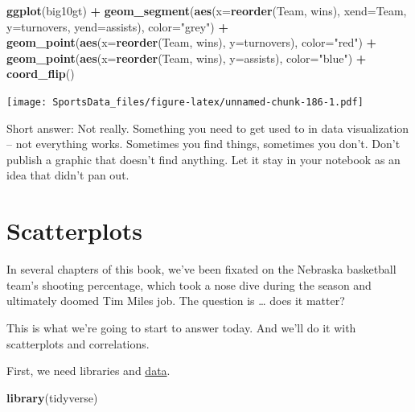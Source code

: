 \documentclass[
]{book}
\newenvironment{Shaded}{\begin{snugshade}}{\end{snugshade}}
\newcommand{\DataTypeTok}[1]{\textcolor[rgb]{0.13,0.29,0.53}{#1}}
\newcommand{\KeywordTok}[1]{\textcolor[rgb]{0.13,0.29,0.53}{\textbf{#1}}}
\newcommand{\NormalTok}[1]{#1}
\newcommand{\OperatorTok}[1]{\textcolor[rgb]{0.81,0.36,0.00}{\textbf{#1}}}
\newcommand{\StringTok}[1]{\textcolor[rgb]{0.31,0.60,0.02}{#1}}
\begin{document}
\begin{Shaded}
\begin{Highlighting}[]
\KeywordTok{ggplot}\NormalTok{(big10gt) }\OperatorTok{+}
\StringTok{  }\KeywordTok{geom_segment}\NormalTok{(}\KeywordTok{aes}\NormalTok{(}\DataTypeTok{x=}\KeywordTok{reorder}\NormalTok{(Team, wins), }\DataTypeTok{xend=}\NormalTok{Team, }\DataTypeTok{y=}\NormalTok{turnovers, }\DataTypeTok{yend=}\NormalTok{assists), }\DataTypeTok{color=}\StringTok{"grey"}\NormalTok{) }\OperatorTok{+}\StringTok{ }
\StringTok{  }\KeywordTok{geom_point}\NormalTok{(}\KeywordTok{aes}\NormalTok{(}\DataTypeTok{x=}\KeywordTok{reorder}\NormalTok{(Team, wins), }\DataTypeTok{y=}\NormalTok{turnovers), }\DataTypeTok{color=}\StringTok{"red"}\NormalTok{) }\OperatorTok{+}\StringTok{ }
\StringTok{  }\KeywordTok{geom_point}\NormalTok{(}\KeywordTok{aes}\NormalTok{(}\DataTypeTok{x=}\KeywordTok{reorder}\NormalTok{(Team, wins), }\DataTypeTok{y=}\NormalTok{assists), }\DataTypeTok{color=}\StringTok{"blue"}\NormalTok{) }\OperatorTok{+}
\StringTok{  }\KeywordTok{coord_flip}\NormalTok{()}
\end{Highlighting}
\end{Shaded}

\texttt{[image: SportsData\_files/figure-latex/unnamed-chunk-186-1.pdf]}

Short answer: Not really. Something you need to get used to in data visualization -- not everything works. Sometimes you find things, sometimes you don't. Don't publish a graphic that doesn't find anything. Let it stay in your notebook as an idea that didn't pan out.

\hypertarget{scatterplots}{%
\chapter{Scatterplots}\label{scatterplots}}

In several chapters of this book, we've been fixated on the Nebraska basketball team's shooting percentage, which took a nose dive during the season and ultimately doomed Tim Miles job. The question is \ldots{} does it matter?

This is what we're going to start to answer today. And we'll do it with scatterplots and correlations.

First, we need libraries and \href{https://unl.box.com/s/a8m91bro10t89watsyo13yjegb1fy009}{data}.

\begin{Shaded}
\begin{Highlighting}[]
\KeywordTok{library}\NormalTok{(tidyverse)}
\end{Highlighting}
\end{Shaded}
\end{document}
